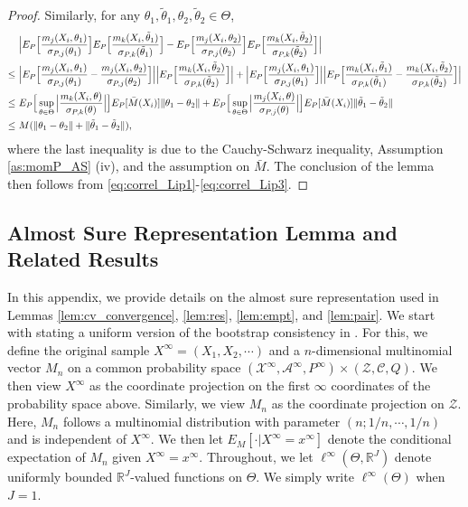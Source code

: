 \documentclass[letterpaper,11pt]{article}
\theoremstyle{myplain}
\theoremstyle{mydefinition}
\theoremstyle{myremark}
\renewcommand{\cite}{\citet}
\numberwithin{equation}{section}
\numberwithin{figure}{section}
\begin{document}
\begin{appendices}
\begin{proof}
Similarly, for any $\theta_1,\tilde\theta_1,\theta_2,\tilde\theta_2\in \Theta$,
\begin{align}
&~	\Big|E_P\Big[\frac{m_j(X_i,\theta_1)}{\sigma_{P,j}(\theta_1)}\Big]E_P\Big[\frac{m_k(X_i,\tilde\theta_1)}{\sigma_{P,k}(\tilde \theta_1)}\Big]-E_P\Big[\frac{m_j(X_i,\theta_2)}{\sigma_{P,j}(\theta_2)}\Big]E_P\Big[\frac{m_k(X_i,\tilde\theta_2)}{\sigma_{P,k}(\tilde \theta_2)}\Big]\Big|\notag\\
\le &~	\Big|E_P\Big[\frac{m_j(X_i,\theta_1)}{\sigma_{P,j}(\theta_1)}-\frac{m_j(X_i,\theta_2)}{\sigma_{P,j}(\theta_2)}\Big]\Big|\Big|E_P\Big[\frac{m_k(X_i,\tilde \theta_2)}{\sigma_{P,k}(\tilde \theta_2)}\Big]\Big|+\Big|E_P\Big[\frac{m_j(X_i,\theta_1)}{\sigma_{P,j}(\theta_1)}\Big]\Big|\Big|E_P\Big[\frac{m_k(X_i,\tilde \theta_1)}{\sigma_{P,k}(\tilde \theta_1)}-\frac{m_k(X_i,\tilde \theta_2)}{\sigma_{P,k}(\tilde \theta_2)}\Big]\Big|\notag\\
\le &~E_P\Big[\sup_{\theta\in\Theta}\Big|\frac{m_k(X_i, \theta)}{\sigma_{P,k}( \theta)}\Big|\Big]E_P[\bar M(X_i)]\|\theta_1-\theta_2\|+E_P\Big[\sup_{\theta\in\Theta}\Big|\frac{m_j(X_i, \theta)}{\sigma_{P,j}( \theta)}\Big|\Big]E_P[\bar M(X_i)]\|\tilde\theta_1-\tilde\theta_2\|\notag\\
\le &~ M(\|\theta_1-\theta_2\|+\|\tilde\theta_1-\tilde\theta_2\|),\label{eq:correl_Lip3}
\end{align}
where the last inequality is due to the Cauchy-Schwarz inequality, Assumption \ref{as:momP_AS} (iv), and the assumption on $\bar M$.
The conclusion of the lemma then follows from \eqref{eq:correl_Lip1}-\eqref{eq:correl_Lip3}.
\end{proof}

\subsection{Almost Sure Representation Lemma and Related Results}
\label{app:asrep}
In this appendix, we provide details on the almost sure representation used in Lemmas \ref{lem:cv_convergence}, \ref{lem:res}, \ref{lem:empt}, and \ref{lem:pair}. 
We start with stating a uniform version of the bootstrap consistency in \cite{Vaart_Wellner2000aBK}.
For this, we define the original sample $X^\infty=(X_1,X_2,\cdots)$ and a $n$-dimensional multinomial vector $M_n$  on a common probability space $(\mathcal X^\infty,\mathcal A^\infty,P^\infty)\times (\mathcal Z,\mathcal C,Q)$. We then view $X^{\infty}$ as the coordinate projection on the first $\infty$ coordinates of the probability space above. Similarly, we view $M_n$ as the coordinate projection on $\mathcal Z$. Here, $M_n$ follows a multinomial distribution with parameter $(n;1/n,\cdots,1/n)$ and is independent of $X^\infty.$
We then let $E_M[\cdot|X^\infty=x^\infty]$ denote the conditional expectation of $M_n$ given $X^\infty=x^\infty.$ Throughout, we let $\ell^\infty(\Theta,\mathbb R^J)$ denote uniformly bounded $\mathbb R^J$-valued functions on $\Theta$. We simply write $\ell^\infty(\Theta)$ when $J=1$. 


\end{appendices}
\end{document}
